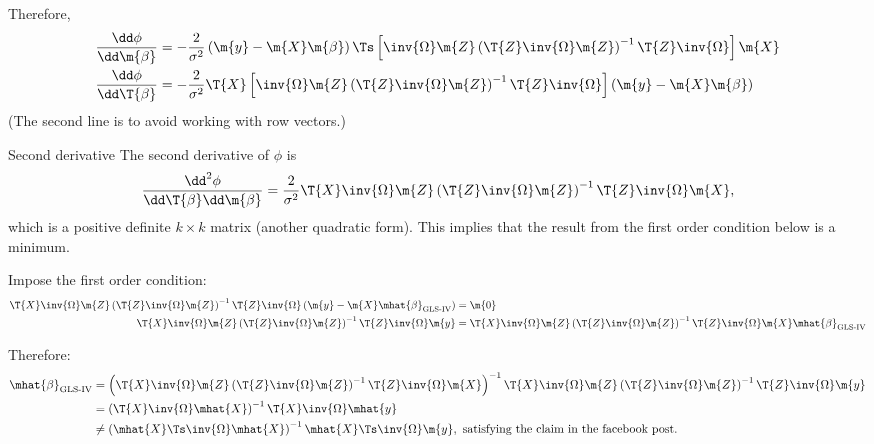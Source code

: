 Therefore,
\begin{equation*}
  \begin{aligned}
    \frac{\dd \phi}{\dd \m{\beta}} &= -\frac{2}{\sigma^2}\left( \m{y} - \m{X}\m{\beta} \right)\Ts \left[ \inv{\Omega} \m{Z} \left( \T{Z} \inv{\Omega} \m{Z} \right)^{-1} \T{Z} \inv{\Omega} \right] \m{X}\\
    \frac{\dd \phi}{\dd \T{\beta}} &= -\frac{2}{\sigma^2} \T{X} \left[ \inv{\Omega} \m{Z} \left( \T{Z} \inv{\Omega} \m{Z} \right)^{-1} \T{Z} \inv{\Omega} \right] \left( \m{y} - \m{X}\m{\beta} \right)
  \end{aligned}
\end{equation*}
(The second line is to avoid working with row vectors.)

\begin{note}{Second derivative}
  \abovedisplayshortskip=0pt
  \belowdisplayshortskip=0pt
  \abovedisplayskip=0pt
  \belowdisplayskip=0pt
The second derivative of $\phi$ is
\begin{equation*}
  \frac{\dd^2 \phi}{\dd \T{\beta} \dd \m{\beta}} = \frac{2}{\sigma^2} \T{X} \inv{\Omega} \m{Z} \left( \T{Z} \inv{\Omega} \m{Z} \right)^{-1} \T{Z} \inv{\Omega} \m{X},
\end{equation*}
which is a positive definite $k \times k$ matrix (another quadratic form). This implies that the result from the first order condition below is a minimum.
\end{note}

Impose the first order condition:
\begin{equation*}
  \begin{aligned}
    \T{X} \inv{\Omega} \m{Z} \left( \T{Z} \inv{\Omega} \m{Z} \right)^{-1} \T{Z} \inv{\Omega} \left( \m{y} - \m{X}\mhat{\beta}_{\text{GLS-IV}} \right) &= \m{0}\\
    \T{X} \inv{\Omega} \m{Z} \left( \T{Z} \inv{\Omega} \m{Z} \right)^{-1} \T{Z} \inv{\Omega} \m{y} &= \T{X} \inv{\Omega} \m{Z} \left( \T{Z} \inv{\Omega} \m{Z} \right)^{-1} \T{Z} \inv{\Omega} \m{X} \mhat{\beta}_{\text{GLS-IV}}
  \end{aligned}
\end{equation*}

Therefore:
\begin{equation*}
  \begin{aligned}
  \mhat{\beta}_{\text{GLS-IV}}
  &= \left( \T{X} \inv{\Omega} \m{Z} \left( \T{Z} \inv{\Omega} \m{Z} \right)^{-1} \T{Z} \inv{\Omega} \m{X} \right)^{-1} \T{X} \inv{\Omega} \m{Z} \left( \T{Z} \inv{\Omega} \m{Z} \right)^{-1} \T{Z} \inv{\Omega} \m{y}\\
  &= \left( \T{X} \inv{\Omega} \mhat{X} \right)^{-1} \T{X} \inv{\Omega} \mhat{y}\\
  &\neq \left( \mhat{X}\Ts \inv{\Omega} \mhat{X} \right)^{-1} \mhat{X}\Ts \inv{\Omega} \m{y},\ \text{satisfying the claim in the facebook post.}
  \end{aligned}
\end{equation*}

